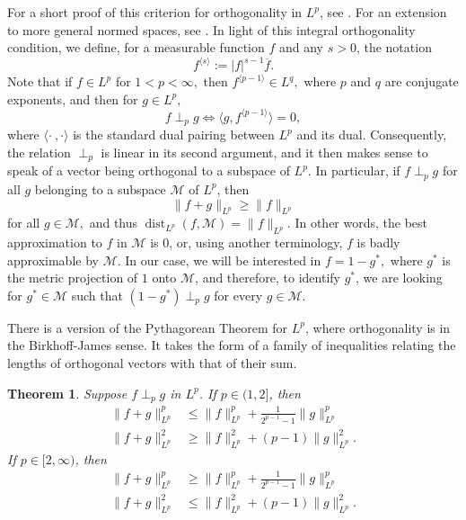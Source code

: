 \documentclass{article}
\theoremstyle{plain}
\newtheorem{Theorem}{Theorem}
\numberwithin{Theorem}{section}
\numberwithin{equation}{section}
\theoremstyle{plain}
\theoremstyle{definition}
\renewcommand{\leq}{\leqslant}
\renewcommand{\geq}{\geqslant}
\begin{document}
For a short proof of this criterion for orthogonality in $L^p$, see \cite[Theorem A, p.\ 124]{DuSchu}. For an extension to more general normed spaces, see \cite{Bea}.
In light of this integral orthogonality condition, we define, for a measurable function $f$ and any $s > 0$, the notation
\begin{equation}\label{s-p}
f^{\langle s \rangle} := |f|^{s-1}\overline{f}.
\end{equation}
Note that if $f \in L^p$ for $1 < p < \infty,$ then $f^{\langle p-1 \rangle} \in L^q,$ where $p$ and $q$ are conjugate exponents, and then for $g \in L^p,$
\[
f \perp_{p} g \iff \langle g, f^{\langle p - 1\rangle} \rangle = 0,
\]
where $\langle \cdot \ , \cdot \rangle$ is the standard dual pairing between $L^p$ and its dual.
Consequently, the relation $\perp_{p}$ is linear in its second argument, and it then makes sense to speak of a vector being orthogonal to a subspace of $L^p$.  In particular, if $f \perp_p g$ for all $g$ belonging to a subspace $\mathscr{M}$ of $L^p$, then
\[
       \| f + g \|_{L^p}  \geq  \|f\|_{L^p}
\]
for all $g \in \mathscr{M},$ and thus  $\operatorname{dist}_{L^p}(f, \mathscr{M}) = \|f\|_{L^p}$.  In other words, the best approximation to $f$ in $\mathscr{M}$ is $0$, or, using another terminology, $f$ is badly approximable by $\mathscr{M}$. In our case, we will be interested in $f = 1 - g^*,$ where $g^*$ is the metric projection of $1$ onto $\mathscr{M}$, and therefore, to identify $g^*$, we are looking for $g^* \in \mathscr{M}$
such that $(1-g^*) \perp_p g$ for every $g \in \mathscr{M}$.



There is a version of the Pythagorean Theorem for $L^p$, where orthogonality is in the Birkhoff-James sense.  It takes the form of a family of inequalities relating the lengths of orthogonal vectors with that of their sum.


\begin{Theorem}\label{pythagthm}
Suppose $f \perp_p g$ in $L^p$.
If $p \in (1, 2]$, then
\begin{align}
   \| f + g \|^p_{L^p} & \leq  \|f\|^p_{L^p} + \frac{1}{2^{p-1}-1}\|g\|^p_{L^p} \label{upper1}\\
    \| f + g \|^2_{L^p} & \geq  \|f\|^2_{L^p} + (p-1)\|g\|^2_{L^p}.\label{lower1}
\end{align}
If $p \in [2, \infty)$, then
\begin{align}
   \| f + g \|^p_{L^p} & \geq  \|f\|^p_{L^p} + \frac{1}{2^{p-1}-1}\|g\|^p_{L^p} \label{lower2}\\
    \| f + g \|^2_{L^p} & \leq  \|f\|^2_{L^p} + (p-1)\|g\|^2_{L^p}.\label{upper2}
\end{align}
\end{Theorem}
\end{document}
